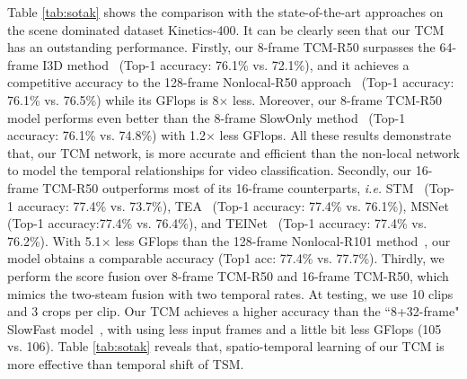 \documentclass[journal]{IEEEtran}
\begin{document}
Table \ref{tab:sotak} shows the comparison with the state-of-the-art approaches on the scene dominated dataset Kinetics-400. It can be clearly seen that our TCM has an outstanding performance. Firstly, our 8-frame TCM-R50 surpasses the 64-frame I3D method~\cite{carreira2017quo} (Top-1 accuracy: 76.1\% vs. 72.1\%), and it achieves a competitive accuracy to the 128-frame Nonlocal-R50 approach~\cite{NonLocal2018} (Top-1 accuracy: 76.1\% vs. 76.5\%) while its GFlops is 8$\times$ less. Moreover, our 8-frame TCM-R50 model performs even better than the 8-frame SlowOnly method~\cite{feichtenhofer2019slowfast} (Top-1 accuracy: 76.1\% vs. 74.8\%) with 1.2$\times$ less GFlops. All these results demonstrate that, our TCM network, is more accurate and efficient than the non-local network to model the temporal relationships for video classification. Secondly, our 16-frame TCM-R50 outperforms most of its 16-frame counterparts, \textit{i.e.} STM~\cite{jiang2019stm} (Top-1 accuracy: 77.4\% vs. 73.7\%), TEA~\cite{li2020tea} (Top-1 accuracy: 77.4\% vs. 76.1\%), MSNet~\cite{kwon2020motionsqueeze} (Top-1 accuracy:77.4\% vs. 76.4\%), and TEINet~\cite{liu2020teinet} (Top-1 accuracy: 77.4\% vs. 76.2\%). With 5.1$\times$ less GFlops than the 128-frame Nonlocal-R101 method~\cite{NonLocal2018}, our model obtains a comparable accuracy (Top1 acc: 77.4\% vs. 77.7\%). Thirdly, we perform the score fusion over 8-frame TCM-R50 and 16-frame TCM-R50, which mimics the two-steam fusion with two temporal rates. At testing, we use 10 clips and 3 crops per clip. Our TCM achieves a higher accuracy than the ``8+32-frame" SlowFast model~\cite{feichtenhofer2019slowfast}, with using less input frames and a little bit less GFlops (105 vs. 106). Table \ref{tab:sotak} reveals that, spatio-temporal learning of our TCM is more effective than temporal shift of TSM.
\end{document}
